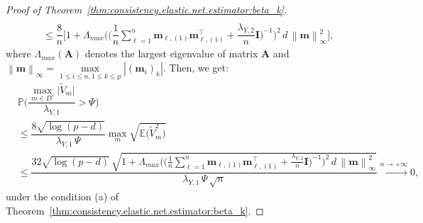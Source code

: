 \documentclass[
  12pt]{article}
\def\M{\mathbf{m}}
\begin{document}
\begin{proof}[Proof of Theorem~\ref{thm:consistency.elastic.net.estimator:beta_k}]
\begin{align*}
		\\ 
		&\leq  \dfrac{8}{n}    \Big[ 1  +   \Lambda_{max}  \Big(  \Big( \dfrac{1}{n}   \sum_{\ell = 1}^{n}    \M_{\ell,(1)}    \M_{\ell,(1)}^{\top}  + \dfrac{ \lambda_{Y,2} }{n} \mathbf{I}  \Big)^{-1} \Big)^{2} \,  d \, \left\|  \M \right\|_{\infty}^{2} \Big], 
	\end{align*}
	where $\Lambda_{max}(\mathbf{A})$ denotes the largest eigenvalue of matrix $\mathbf{A}$ and $\left\|  \M \right\|_{\infty} = \underset{1 \leq i \leq n, 1 \leq k \leq p}{\max}  | (\M_{i})_{k} |$. 
	Then, we get:
	\begin{align*}
		& \mathbb{P} \Bigg(    \dfrac{ \displaystyle{  \max_{m \in D^{c}} }   \big|   \widetilde{V}_{m}   \big| }{ \lambda_{Y,1} }  > \Psi  \Bigg)  
		\\  
		&\leq   \dfrac{ 8 \sqrt{ \log(p - d) } }{ \lambda_{Y,1} \,  \Psi }  \max_{m} \sqrt{ \mathbb{E} \big( \widetilde{V}_{m}^{2}   \big)  } 
		\\
		&\leq  \dfrac{ 32  \sqrt{ \log(p - d) }  \,  \sqrt{ 1  +   \Lambda_{max}  \Big(   \Big( \frac{1}{n}  \sum_{\ell = 1}^{n}    \M_{\ell,(1)}    \M_{\ell,(1)}^{\top}  + \frac{ \lambda_{Y,2} }{n} \mathbf{I}  \Big)^{-1} \Big)^{2} \,  d \, \left\|  \M \right\|_{\infty}^{2} }  }{ \lambda_{Y,1} \,  \Psi \,  \sqrt{n}  }  \overset{n  \rightarrow  +\infty}{\longrightarrow} 0 ,   
	\end{align*}
	under the condition (a) of Theorem~\ref{thm:consistency.elastic.net.estimator:beta_k}. 

\end{proof}
\end{document}
